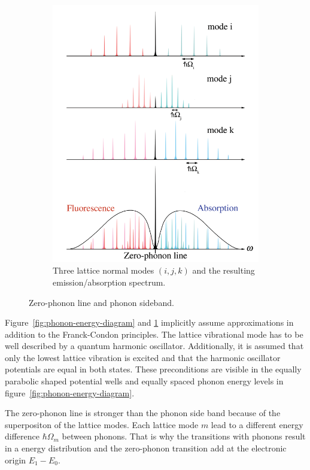 \begin{figure}[H]
\begin{subfigure}[b]{0.48\textwidth}
		\includegraphics[width=\textwidth]{figures/quantum-dot/Lattice-modes}
		\caption{Three lattice normal modes $(i, j, k)$ and the resulting emission/absorption spectrum.\\}
		\label{fig:lattice-modes}
	\end{subfigure}
	\caption{Zero-phonon line and phonon sideband.~\cite{noauthor_zero-phonon_nodate}}
	\label{fig:zero-phonon-line-phonon-side-band}
\end{figure}
Figure~\ref{fig:phonon-energy-diagram} and \ref{fig:lattice-modes} implicitly assume approximations in addition to the Franck-Condon principles.
The lattice vibrational mode has to be well described by a quantum harmonic oscillator.
Additionally, it is assumed that only the lowest lattice vibration is excited and that the harmonic oscillator potentials are equal in both states.
These preconditions are visible in the equally parabolic shaped potential wells and equally spaced phonon energy levels in figure~\ref{fig:phonon-energy-diagram}.

The zero-phonon line is stronger than the phonon side band because of the superpositon of the lattice modes. Each lattice mode $m$ lead to a different energy difference $\hbar \Omega_m$ between phonons.
That is why the transitions with phonons result in a energy distribution and the zero-phonon transition add at the electronic origin $E_1 - E_0$.

